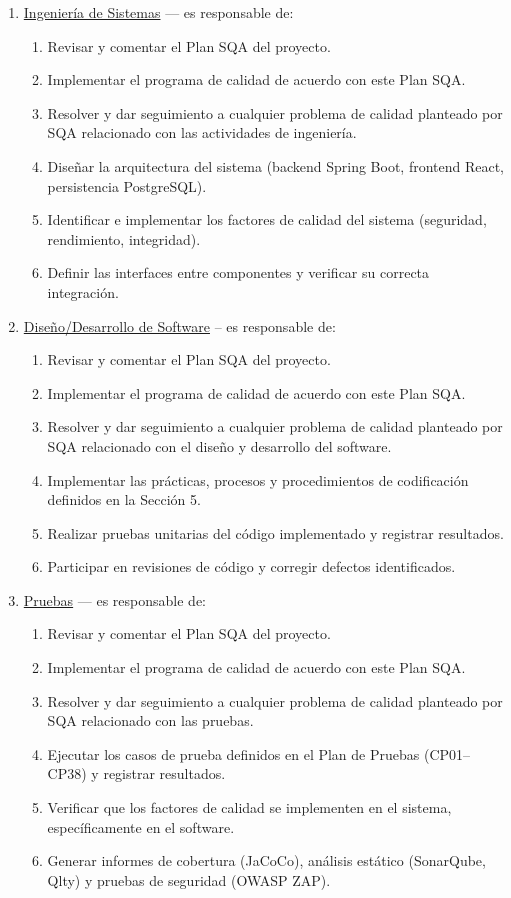 \begin{enumerate}
    \item \underline{Ingeniería de Sistemas} --- es responsable de:
    \begin{enumerate}
        \item Revisar y comentar el Plan SQA del proyecto.
        \item Implementar el programa de calidad de acuerdo con este Plan SQA.
        \item Resolver y dar seguimiento a cualquier problema de calidad planteado por SQA relacionado con las actividades de ingeniería.
        \item Diseñar la arquitectura del sistema (backend Spring Boot, frontend React, persistencia PostgreSQL).
        \item Identificar e implementar los factores de calidad del sistema (seguridad, rendimiento, integridad).
        \item Definir las interfaces entre componentes y verificar su correcta integración.
    \end{enumerate}

    \item \underline{Diseño/Desarrollo de Software} -- es responsable de:
    \begin{enumerate}
        \item Revisar y comentar el Plan SQA del proyecto.
        \item Implementar el programa de calidad de acuerdo con este Plan SQA.
        \item Resolver y dar seguimiento a cualquier problema de calidad planteado por SQA relacionado con el diseño y desarrollo del software.
        \item Implementar las prácticas, procesos y procedimientos de codificación definidos en la Sección 5.
        \item Realizar pruebas unitarias del código implementado y registrar resultados.
        \item Participar en revisiones de código y corregir defectos identificados.
    \end{enumerate}

    \item \underline{Pruebas} --- es responsable de:
    \begin{enumerate}
        \item Revisar y comentar el Plan SQA del proyecto.
        \item Implementar el programa de calidad de acuerdo con este Plan SQA.
        \item Resolver y dar seguimiento a cualquier problema de calidad planteado por SQA relacionado con las pruebas.
        \item Ejecutar los casos de prueba definidos en el Plan de Pruebas (CP01--CP38) y registrar resultados.
        \item Verificar que los factores de calidad se implementen en el sistema, específicamente en el software.
        \item Generar informes de cobertura (JaCoCo), análisis estático (SonarQube, Qlty) y pruebas de seguridad (OWASP ZAP).
    \end{enumerate}
\end{enumerate}

